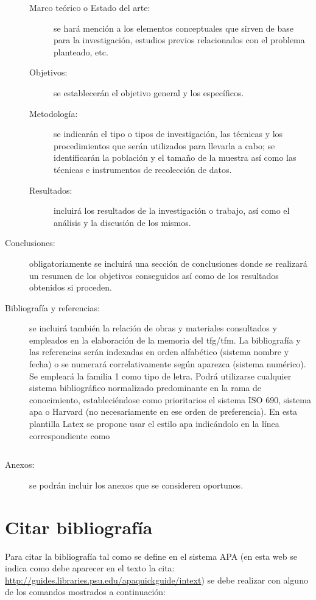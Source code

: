 \begin{description}
\begin{description}
\item[Marco teórico o Estado del arte:] se hará mención a los elementos conceptuales que sirven de base para la investigación, estudios previos relacionados con el problema planteado, etc.
\item[Objetivos:] se establecerán el objetivo general y los específicos.
\item[Metodología:] se indicarán el tipo o tipos de investigación, las técnicas y los procedimientos que serán utilizados para llevarla a cabo; se identificarán la población y el tamaño de la muestra así como las técnicas e instrumentos de recolección de datos.
\item[Resultados:] incluirá los resultados de la investigación o trabajo, así como el análisis y la discusión de los mismos.
\end{description}
\item[Conclusiones:] obligatoriamente se incluirá una sección de conclusiones donde se realizará un resumen de los objetivos conseguidos así como de los resultados obtenidos si proceden.
\item[Bibliografía y referencias:] se incluirá también la relación de obras y materiales consultados y empleados en la elaboración de la memoria del \gls{tfg}/\gls{tfm}. La bibliografía y las referencias serán indexadas en orden alfabético (sistema nombre y fecha) o se numerará correlativamente según aparezca (sistema numérico). Se empleará la familia 1 como tipo de letra. Podrá utilizarse cualquier sistema bibliográfico normalizado predominante en la rama de conocimiento, estableciéndose como prioritarios el sistema ISO 690, sistema \gls{apa}  o Harvard (no necesariamente en ese orden de preferencia). En esta plantilla Latex se propone usar el estilo \gls{apa} indicándolo en la línea correspondiente como 
\begin{verbatim}

\end{verbatim}
\item[Anexos:] se podrán incluir los anexos que se consideren oportunos.
\end{description}

\section{Citar bibliografía}
Para citar la bibliografía tal como se define en el sistema APA (en esta web se indica como debe aparecer en el texto la cita: \url{http://guides.libraries.psu.edu/apaquickguide/intext}) se debe realizar con alguno de los comandos mostrados a continuación:

